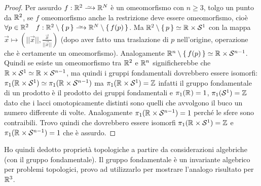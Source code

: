 \begin{proof}
  Per assurdo $ f : \RN{2} \homoto \RN{N} $ è un omeomorfismo con
  $ n \geq 3 $, tolgo un punto da $ \mathbb{R}^{2} $, se $ f $ omeomorfismo anche la restrizione deve essere omeomorfismo, cioè
  $ \forall p \in \RN{2} \quad f:\RN{2} \setminus \set{p} \homoto \RN{N} \setminus \set{f(p)} $.
  Ma $ \mathbb{R}^{2} \setminus \set{p} \simeq \mathbb{R}^{} \times \mathcal{S}^1 $ con la mappa
  $ \vec{x} \mapsto \left( || \vec{x} ||, \frac{\vec{x}}{|| \vec{x} ||} \right) $ (dopo aver fatto
  una traslazione di $ p $ nell'origine, operazione che è certamente un omeomorfismo).
  Analogamente $ \mathbb{R}^{n} \setminus \set{f(p)} \simeq \mathbb{R}^{} \times \mathcal{S}^{n-1} $. Quindi se esiste un omeomorfismo tra $ \mathbb{R}^{2} $ e
  $ \mathbb{R}^{n} $ significherebbe che $ \mathbb{R}^{} \times \mathcal{S}^{1} \simeq \mathbb{R}^{} \times \mathcal{S}^{n-1} $, ma quindi i gruppi fondamentali
  dovrebbero essere isomorfi:
  $ \pi_1 (\mathbb{R}^{} \times \mathcal{S}^{1}) \simeq \pi_1(\mathbb{R}^{}\times \mathcal{S}^{n-1}) $ ma
  $ \pi_1 (\mathbb{R}^{} \times \mathcal{S}^{1}) = \mathbb{Z} $ infatti il gruppo fondamentale di un prodotto è il prodotto dei gruppi
  fondamentali e $ \pi_1(\mathbb{R}^{}) = 1 $, $ \pi_1(\mathcal{S}^{1}) = \mathbb{Z} $ dato che i lacci omotopicamente distinti
  sono quelli che avvolgono il buco un numero differente di volte. Analogamente $ \pi_1(\mathbb{R}^{}\times \mathcal{S}^{n-1}) = 1 $
  perché le sfere sono contraibili. Trovo quindi che dovrebbero essere isomorfi $ \pi_1 (\mathbb{R}^{} \times \mathcal{S}^{1}) = \mathbb{Z} $
  e $ \pi_1(\mathbb{R}^{}\times \mathcal{S}^{n-1}) = 1 $ che è assurdo.
\end{proof}
\hfill \newline \newline \noindent
Ho quindi dedotto proprietà topologiche a partire da considerazioni algebriche (con il gruppo fondamentale).
Il gruppo fondamentale è un invariante algebrico per problemi topologici, provo ad utilizzarlo per mostrare
l'analogo risultato per $ \mathbb{R}^{3} $.


